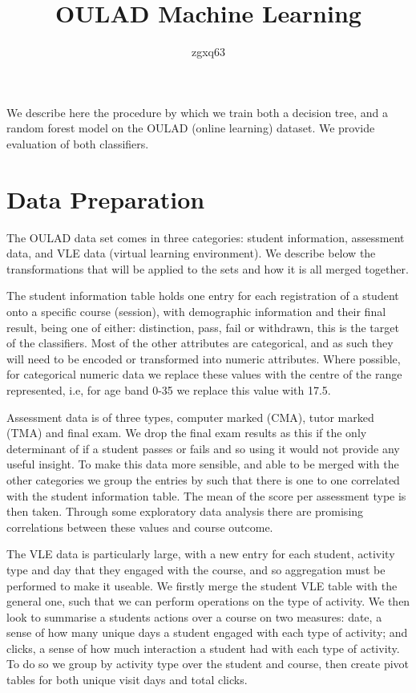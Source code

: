 \documentclass[11pt,a4paper]{article}
\begin{document}
\author{zgxq63}
\title{OULAD Machine Learning}
\date{}


We describe here the procedure by which we train both a decision tree, and a random forest model on the OULAD (online learning) dataset. We provide evaluation of both classifiers.

\section{Data Preparation}

The OULAD data set comes in three categories: student information, assessment data, and VLE data (virtual learning environment). We describe below the transformations that will be applied to the sets and how it is all merged together.

The student information table holds one entry for each registration of a student onto a specific course (session), with demographic information and their final result, being one of either: distinction, pass, fail or withdrawn, this is the target of the classifiers. Most of the other attributes are categorical, and as such they will need to be encoded or transformed into numeric attributes. Where possible, for categorical numeric data we replace these values with the centre of the range represented, i.e, for age band 0-35 we replace this value with 17.5.

Assessment data is of three types, computer marked (CMA), tutor marked (TMA) and final exam. We drop the final exam results as this if the only determinant of if a student passes or fails and so using it would not provide any useful insight. To make this data more sensible, and able to be merged with the other categories we group the entries by such that there is one to one correlated with the student information table. The mean of the score per assessment type is then taken. Through some exploratory data analysis there are promising correlations between these values and course outcome.

The VLE data is particularly large, with a new entry for each student, activity type and day that they engaged with the course, and so aggregation must be performed to make it useable. We firstly merge the student VLE table with the general one, such that we can perform operations on the type of activity. We then look to summarise a students actions over a course on two measures: date, a sense of how many unique days a student engaged with each type of activity; and clicks, a sense of how much interaction a student had with each type of activity. To do so we group by activity type over the student and course, then create pivot tables for both unique visit days and total clicks.
\end{document}
